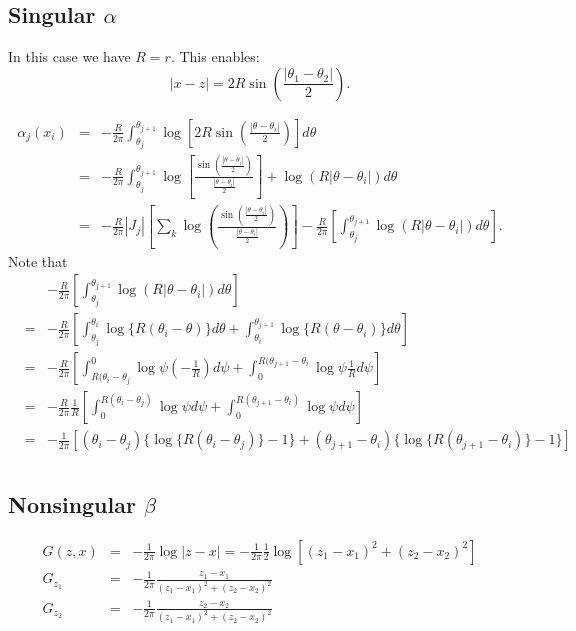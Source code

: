 \subsection{Singular $\alpha$}
In this case we have $R = r$. This enables:
\begin{equation}
|x-z| = 2 R \sin(\frac{|\theta_1 - \theta_2|}{2}).
\end{equation}

\begin{eqnarray}
\alpha_j(x_i) &=& - \frac{R}{2\pi} \int_{\theta_j}^{\theta_{j+1}}  \log \left[2R\sin(\frac{|\theta - \theta_i|}{2}) \right] d\theta \\
&=&- \frac{R}{2\pi} \int_{\theta_j}^{\theta_{j+1}}  \log\left[\frac{\sin(\frac{|\theta - \theta_i|}{2})}{\frac{|\theta - \theta_i|}{2}}\right] + \log(R |\theta-\theta_i|)d\theta \\
&=&- \frac{R}{2\pi} |J_j| \left[\sum_k\log(\frac{\sin(\frac{|\theta -\theta_i|}{2})}{\frac{|\theta -\theta_i|}{2}})\right]-\frac{R}{2\pi}\left[\int_{\theta_j}^{\theta_{j+1}}\log(R|\theta-\theta_i|) d\theta \right].
\end{eqnarray}
Note that
\begin{eqnarray}
&&-\frac{R}{2\pi}\left[\int_{\theta_j}^{\theta_{j+1}}\log(R|\theta-\theta_i|) d\theta \right]\\
&=&-\frac{R}{2\pi}\left[\int_{\theta_j}^{\theta_i}\log\{R(\theta_i-\theta)\}d\theta+\int_{\theta_i}^{\theta_{j+1}}\log\{R(\theta-\theta_i)\}d\theta\right]\\
&=&-\frac{R}{2\pi}\left[\int_{R(\theta_i-\theta_j}^{0}\log\psi(-\frac{1}{R})d\psi+\int_{0}^{R(\theta_{j+1}-\theta_i}\log\psi \frac{1}{R} d\psi \right]\\
&=&-\frac{R}{2\pi} \frac{1}{R} \left[\int_{0}^{R(\theta_i-\theta_j)}\log\psi d\psi+\int_{0}^{R(\theta_{j+1}-\theta_i)}\log\psi d\psi \right]\\
&=&-\frac{1}{2\pi} \left[ (\theta_i-\theta_j)\{ \log\{R(\theta_i-\theta_j)\} - 1 \} + (\theta_{j+1}-\theta_i) \{ \log\{R(\theta_{j+1}-\theta_i)\}-1\}\right]\\
\end{eqnarray}

\subsection{Nonsingular $\beta$}
\begin{eqnarray}
G(z, x) &=& -\frac{1}{2\pi}\log|z-x| = -\frac{1}{2\pi} \frac{1}{2} \log\left[ (z_1-x_1)^2 + (z_2-x_2)^2 \right] \\
G_{z_1} &=& -\frac{1}{2\pi}\frac{z_1-x_1}{(z_1-x_1)^2 +(z_2-x_2)^2}\\
G_{z_2} &=& -\frac{1}{2\pi}\frac{z_2-x_2}{(z_1-x_1)^2 +(z_2-x_2)^2}\\
\end{eqnarray}

